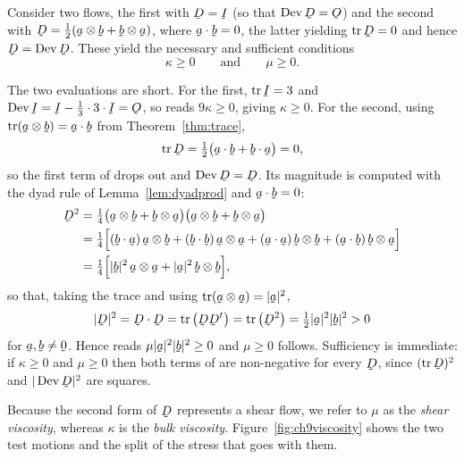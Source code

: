 Consider two flows, the first with $\bD=\I$ (so that $\Dev\bD=\Ob$) and
the second with $\bD=\tfrac12(\ba\otimes\bb+\bb\otimes\ba)$, where
$\ip\ba\bb=0$, the latter yielding $\tr\bD=0$ and hence $\bD=\Dev\bD$.
These yield the necessary and sufficient conditions
\begin{equation}
   \kappa\geq0
   \qquad\text{and}\qquad
   \mu\geq0 .
   \tag{9.79}\label{eq:9.79}
\end{equation}

The two evaluations are short. For the first, $\tr\I=3$ and
$\Dev\I=\I-\tfrac13\cdot3\cdot\I=\Ob$, so  reads
$9\kappa\geq0$, giving $\kappa\geq0$. For the second, using
$\tr(\ba\otimes\bb)=\ip\ba\bb$ from Theorem~\ref{thm:trace},
\[
   \tr\bD=\tfrac12\big(\ip\ba\bb+\ip\bb\ba\big)=0 ,
\]
so the first term of  drops out and $\Dev\bD=\bD$. Its
magnitude is computed with the dyad rule of Lemma~\ref{lem:dyadprod} and
$\ip\ba\bb=0$:
\[
\begin{aligned}
   \bD^{2}&=\tfrac14\big(\ba\otimes\bb+\bb\otimes\ba\big)
     \big(\ba\otimes\bb+\bb\otimes\ba\big)\\
   &=\tfrac14\Big[(\ip\bb\ba)\,\ba\otimes\bb
     +(\ip\bb\bb)\,\ba\otimes\ba
     +(\ip\ba\ba)\,\bb\otimes\bb
     +(\ip\ba\bb)\,\bb\otimes\ba\Big]\\
   &=\tfrac14\Big[|\bb|^{2}\,\ba\otimes\ba+|\ba|^{2}\,\bb\otimes\bb\Big],
\end{aligned}
\]
so that, taking the trace and using $\tr(\ba\otimes\ba)=|\ba|^{2}$,
\[
   |\bD|^{2}=\ip\bD\bD=\tr\big(\bD\bD^{t}\big)=\tr\big(\bD^{2}\big)
   =\tfrac12|\ba|^{2}|\bb|^{2}>0
\]
for $\ba,\bb\neq\bze$. Hence  reads
$\mu|\ba|^{2}|\bb|^{2}\geq0$ and $\mu\geq0$ follows. Sufficiency is
immediate: if $\kappa\geq0$ and $\mu\geq0$ then both terms of
 are non-negative for every $\bD$, since $(\tr\bD)^{2}$ and
$|\Dev\bD|^{2}$ are squares.

Because the second form of $\bD$ represents a shear flow, we refer to
$\mu$ as the \emph{shear viscosity}, whereas $\kappa$ is the \emph{bulk
viscosity}. Figure~\ref{fig:ch9viscosity} shows the two test motions and
the split of the stress that goes with them.

